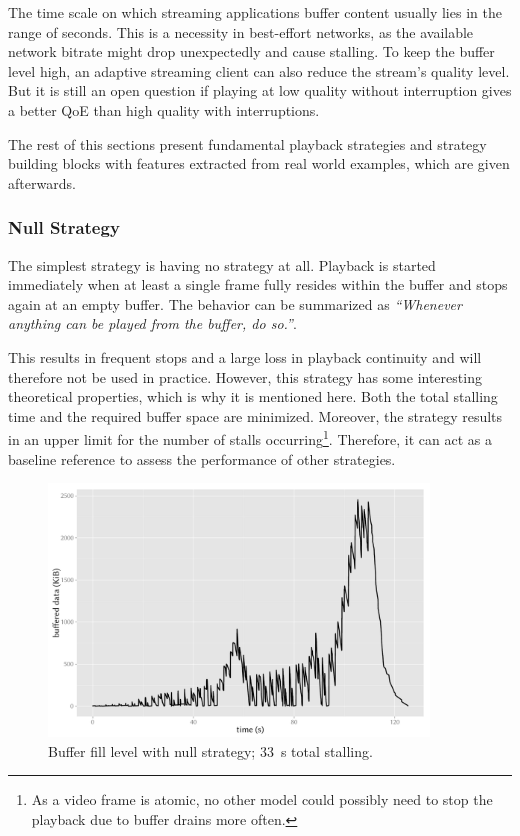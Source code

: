 The time scale on which streaming applications buffer content usually lies in the range of seconds. This is a necessity in best-effort networks, as the available network bitrate might drop unexpectedly and cause stalling. To keep the buffer level high, an adaptive streaming client can also reduce the stream's quality level. But it is still an open question if playing at low quality without interruption gives a better \gls{QoE} than high quality with interruptions.

The rest of this sections present fundamental playback strategies and strategy building blocks with features extracted from real world examples, which are given afterwards. 



\subsubsection{Null Strategy}

The simplest strategy is having no strategy at all. Playback is started immediately when at least a single frame fully resides within the buffer and stops again at an empty buffer. The behavior can be summarized as \textit{``Whenever anything can be played from the buffer, do so.''}.

This results in frequent stops and a large loss in playback continuity and will therefore not be used in practice. However, this strategy has some interesting theoretical properties, which is why it is mentioned here. Both the total stalling time and the required buffer space are minimized. Moreover, the strategy results in an upper limit for the number of stalls occurring\footnote{As a video frame is atomic, no other model could possibly need to stop the playback due to buffer drains more often.}. Therefore, it can act as a baseline reference to assess the performance of other strategies.

\begin{figure}[htb]
	\centering
	\includegraphics[width=0.9\textwidth]{images/R-bufferlevel-stall.pdf}
	\caption{Buffer fill level with null strategy; \SI{33}{\second} total stalling.}
\label{c3:fig:bufferlevel-stall}
\end{figure}

